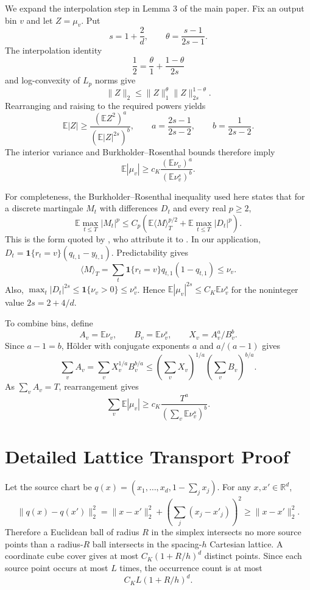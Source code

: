 \documentclass[twoside]{article}
\newcommand{\E}{\mathbb E}
\newcommand{\1}{\mathbf 1}
\begin{document}
We expand the interpolation step in Lemma 3 of the main paper. Fix an output
bin $v$ and let $Z=\mu_v$. Put
\[
 s=1+\frac2d,
 \qquad
 \theta=\frac{s-1}{2s-1}.
\]
The interpolation identity
\[
 \frac12=\frac{\theta}{1}+\frac{1-\theta}{2s}
\]
and log-convexity of $L_p$ norms give
\[
 \|Z\|_2\leq\|Z\|_1^\theta\|Z\|_{2s}^{1-\theta}.
\]
Rearranging and raising to the required powers yields
\[
 \E|Z|
 \geq
 \frac{(\E Z^2)^a}{(\E|Z|^{2s})^b},
 \qquad
 a=\frac{2s-1}{2s-2},
 \qquad
 b=\frac1{2s-2}.
\]
The interior variance and Burkholder--Rosenthal bounds therefore imply
\[
 \E|\mu_v|
 \geq c_K\frac{(\E\nu_v)^a}{(\E\nu_v^s)^b}.
\]

For completeness, the Burkholder--Rosenthal inequality used here states that
for a discrete martingale $M_t$ with differences $D_t$ and every real
$p\geq2$,
\[
 \E\max_{t\leq T}|M_t|^p
 \leq C_p\left(
 \E\langle M\rangle_T^{p/2}
 +\E\max_{t\leq T}|D_t|^p\right).
\]
This is the form quoted by \citet[Lemma 1]{collina2026optimal}, who attribute
it to \citet{burkholder1973distribution}. In our application,
$D_t=\1\{r_t=v\}(q_{t,1}-y_{t,1})$. Predictability gives
\[
 \langle M\rangle_T
 =\sum_t\1\{r_t=v\}q_{t,1}(1-q_{t,1})\leq\nu_v.
\]
Also,
$\max_t|D_t|^{2s}\leq\1\{\nu_v>0\}\leq\nu_v^s$. Hence
$\E|\mu_v|^{2s}\leq C_K\E\nu_v^s$ for the noninteger value
$2s=2+4/d$.

To combine bins, define
\[
 A_v=\E\nu_v,
 \qquad B_v=\E\nu_v^s,
 \qquad X_v=A_v^a/B_v^b.
\]
Since $a-1=b$, H\"older with conjugate exponents $a$ and $a/(a-1)$ gives
\[
 \sum_v A_v
 =\sum_vX_v^{1/a}B_v^{b/a}
 \leq\left(\sum_vX_v\right)^{1/a}
 \left(\sum_vB_v\right)^{b/a}.
\]
As $\sum_vA_v=T$, rearrangement gives
\[
 \sum_v\E|\mu_v|
 \geq c_K\frac{T^a}{(\sum_v\E\nu_v^s)^b}.
\]

\section{Detailed Lattice Transport Proof}

Let the source chart be
$q(x)=(x_1,\ldots,x_d,1-\sum_jx_j)$. For any $x,x'\in\mathbb R^d$,
\[
 \|q(x)-q(x')\|_2^2
 =\|x-x'\|_2^2+\left(\sum_j(x_j-x'_j)\right)^2
 \geq\|x-x'\|_2^2.
\]
Therefore a Euclidean ball of radius $R$ in the simplex intersects no more
source points than a radius-$R$ ball intersects in the spacing-$h$ Cartesian
lattice. A coordinate cube cover gives at most
$C_K(1+R/h)^d$ distinct points. Since each source point occurs at most $L$
times, the occurrence count is at most
\begin{equation}\label{eq:ballcount}
 C_KL(1+R/h)^d.
\end{equation}
\end{document}
